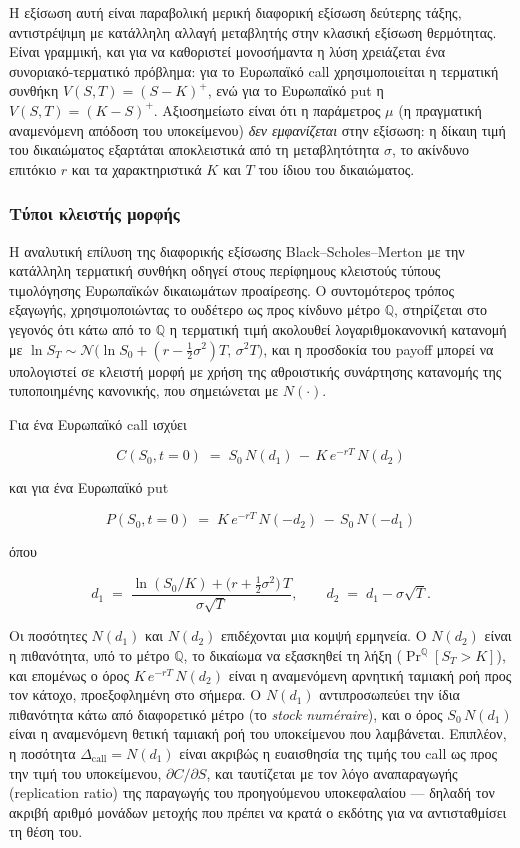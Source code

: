 \documentclass[12pt]{article}
\begin{document}
Η εξίσωση αυτή είναι παραβολική μερική διαφορική εξίσωση δεύτερης τάξης, αντιστρέψιμη με κατάλληλη αλλαγή μεταβλητής στην κλασική εξίσωση θερμότητας. Είναι γραμμική, και για να καθοριστεί μονοσήμαντα η λύση χρειάζεται ένα συνοριακό-τερματικό πρόβλημα: για το Ευρωπαϊκό call χρησιμοποιείται η τερματική συνθήκη $V(S, T) = (S - K)^+$, ενώ για το Ευρωπαϊκό put η $V(S, T) = (K - S)^+$. Αξιοσημείωτο είναι ότι η παράμετρος $\mu$ (η πραγματική αναμενόμενη απόδοση του υποκείμενου) \emph{δεν εμφανίζεται} στην εξίσωση: η δίκαιη τιμή του δικαιώματος εξαρτάται αποκλειστικά από τη μεταβλητότητα $\sigma$, το ακίνδυνο επιτόκιο $r$ και τα χαρακτηριστικά $K$ και $T$ του ίδιου του δικαιώματος. 

\subsubsection{Τύποι κλειστής μορφής}

Η αναλυτική επίλυση της διαφορικής εξίσωσης Black–Scholes–Merton με την κατάλληλη τερματική συνθήκη οδηγεί στους περίφημους κλειστούς τύπους τιμολόγησης Ευρωπαϊκών δικαιωμάτων προαίρεσης. Ο συντομότερος τρόπος εξαγωγής, χρησιμοποιώντας το ουδέτερο ως προς κίνδυνο μέτρο $\mathbb{Q}$, στηρίζεται στο γεγονός ότι κάτω από το $\mathbb{Q}$ η τερματική τιμή ακολουθεί λογαριθμοκανονική κατανομή με $\ln S_T \sim \mathcal{N}\!\bigl(\ln S_0 + (r - \tfrac12\sigma^2)T,\, \sigma^2 T\bigr)$, και η προσδοκία του payoff μπορεί να υπολογιστεί σε κλειστή μορφή με χρήση της αθροιστικής συνάρτησης κατανομής της τυποποιημένης κανονικής, που σημειώνεται με $N(\cdot)$.

Για ένα Ευρωπαϊκό call ισχύει

$$
\boxed{\,C(S_0, t = 0) \;=\; S_0\,N(d_1) \,-\, K\,e^{-rT}\,N(d_2)\,}
$$

και για ένα Ευρωπαϊκό put

$$
\boxed{\,P(S_0, t = 0) \;=\; K\,e^{-rT}\,N(-d_2) \,-\, S_0\,N(-d_1)\,}
$$

όπου

$$
d_1 \;=\; \frac{\ln(S_0/K) + \bigl(r + \tfrac{1}{2}\sigma^2\bigr)\,T}{\sigma\sqrt{T}}, \qquad
d_2 \;=\; d_1 - \sigma\sqrt{T}.
$$

Οι ποσότητες $N(d_1)$ και $N(d_2)$ επιδέχονται μια κομψή ερμηνεία. Ο $N(d_2)$ είναι η πιθανότητα, υπό το μέτρο $\mathbb{Q}$, το δικαίωμα να εξασκηθεί τη λήξη ($\Pr^{\mathbb{Q}}[S_T > K]$), και επομένως ο όρος $K\,e^{-rT}\,N(d_2)$ είναι η αναμενόμενη αρνητική ταμιακή ροή προς τον κάτοχο, προεξοφλημένη στο σήμερα. Ο $N(d_1)$ αντιπροσωπεύει την ίδια πιθανότητα κάτω από διαφορετικό μέτρο (το \emph{stock numéraire}), και ο όρος $S_0\,N(d_1)$ είναι η αναμενόμενη θετική ταμιακή ροή του υποκείμενου που λαμβάνεται. Επιπλέον, η ποσότητα $\Delta_{\text{call}} = N(d_1)$ είναι ακριβώς η ευαισθησία της τιμής του call ως προς την τιμή του υποκείμενου, $\partial C/\partial S$, και ταυτίζεται με τον λόγο αναπαραγωγής (replication ratio) της παραγωγής του προηγούμενου υποκεφαλαίου — δηλαδή τον ακριβή αριθμό μονάδων μετοχής που πρέπει να κρατά ο εκδότης για να αντισταθμίσει τη θέση του.
\end{document}
